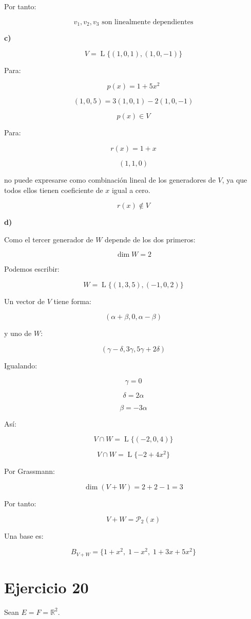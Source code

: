 \documentclass[11pt,a4paper]{article}
\newcommand{\R}{\mathbb{R}}
\newcommand{\Pn}{\mathcal{P}}
\newcommand{\Span}{\operatorname{L}}
\newcommand{\dimn}{\operatorname{dim}}
\begin{document}
	Por tanto:

	\[
	\boxed{
	v_1,v_2,v_3
	\text{ son linealmente dependientes}
	}
	\]

	\textbf{c)}

	\[
	V=
	\Span\{(1,0,1),(1,0,-1)\}
	\]

	Para:

	\[
	p(x)=1+5x^2
	\]

	\[
	(1,0,5)
	=
	3(1,0,1)
	-2(1,0,-1)
	\]

	\[
	\boxed{
	p(x)\in V
	}
	\]

	Para:

	\[
	r(x)=1+x
	\]

	\[
	(1,1,0)
	\]

	no puede expresarse como combinación lineal de los generadores de $V$, ya que todos ellos tienen coeficiente de $x$ igual a cero.

	\[
	\boxed{
	r(x)\notin V
	}
	\]

	\textbf{d)}

	Como el tercer generador de $W$ depende de los dos primeros:

	\[
	\dimn W=2
	\]

	Podemos escribir:

	\[
	W=
	\Span\{(1,3,5),(-1,0,2)\}
	\]

	Un vector de $V$ tiene forma:

	\[
	(\alpha+\beta,0,\alpha-\beta)
	\]

	y uno de $W$:

	\[
	(\gamma-\delta,3\gamma,5\gamma+2\delta)
	\]

	Igualando:

	\[
	\gamma=0
	\]

	\[
	\delta=2\alpha
	\]

	\[
	\beta=-3\alpha
	\]

	Así:

	\[
	V\cap W
	=
	\Span\{(-2,0,4)\}
	\]

	\[
	\boxed{
	V\cap W
	=
	\Span\{-2+4x^2\}
	}
	\]

	Por Grassmann:

	\[
	\dimn(V+W)
	=
	2+2-1
	=
	3
	\]

	Por tanto:

	\[
	V+W=\Pn_2(x)
	\]

	Una base es:

	\[
	\boxed{
	B_{V+W}
	=
	\{1+x^2,\;1-x^2,\;1+3x+5x^2\}
	}
	\]

\section{Ejercicio 20}
	Sean $E=F=\R^2$.
\end{document}
